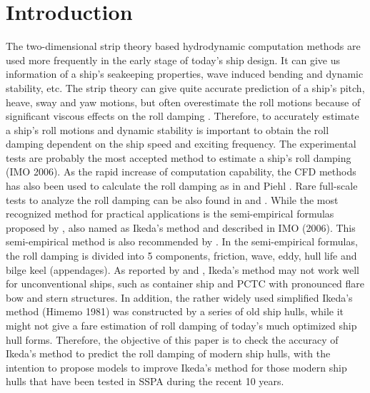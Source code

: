 \section{Introduction}
\label{se:introduction}

%    

The two-dimensional strip theory based hydrodynamic computation methods are used more frequently in the early stage of today's ship design. It can give us information of a ship's seakeeping properties, wave induced bending and dynamic stability, etc. The strip theory can give quite accurate prediction of a ship's pitch, heave, sway and yaw motions, but often overestimate the roll motions because of significant viscous effects on the roll damping \parencite{kawahara_simple_2011}. Therefore, to accurately estimate a ship's roll motions and dynamic stability is important to obtain the roll damping dependent on the ship speed and exciting frequency. The experimental tests are probably the most accepted method to estimate a ship's roll damping (IMO 2006). As the rapid increase of computation capability, the CFD methods has also been used to calculate the roll damping as in \parencite{kristiansen_experimental_2014} and Piehl \parencite{henry_peter_piehl_ship_nodate}. Rare full-scale tests to analyze the roll damping can be also found in \parencite{schmitke_ship_1978} and \parencite{soder_assessment_2019}. While the most recognized method for practical applications is the semi-empirical formulas proposed by  \parencite{ikeda_eddy_1978,ikeda_components_1978,ikeda_roll_1979,ikeda_velocity_1979}, also named as Ikeda's method and described in IMO (2006). This semi-empirical method is also recommended by \parencite{ittc_ittc_2011}. In the semi-empirical formulas, the roll damping is divided into 5 components, friction, wave, eddy, hull life and bilge keel (appendages). As reported by  \parencite{kawahara_simple_2011} and \parencite{soder_ikeda_2019}, Ikeda's method may not work well for unconventional ships, such as container ship and PCTC with pronounced flare bow and stern structures. In addition, the rather widely used simplified Ikeda's method (Himemo 1981) was constructed by a series of old ship hulls, while it might not give a fare estimation of roll damping of today's much optimized ship hull forms. Therefore, the objective of this paper is to check the accuracy of Ikeda's method to predict the roll damping of modern ship hulls, with the intention to propose models to improve Ikeda's method for those modern ship hulls that have been tested in SSPA during the recent 10 years.

